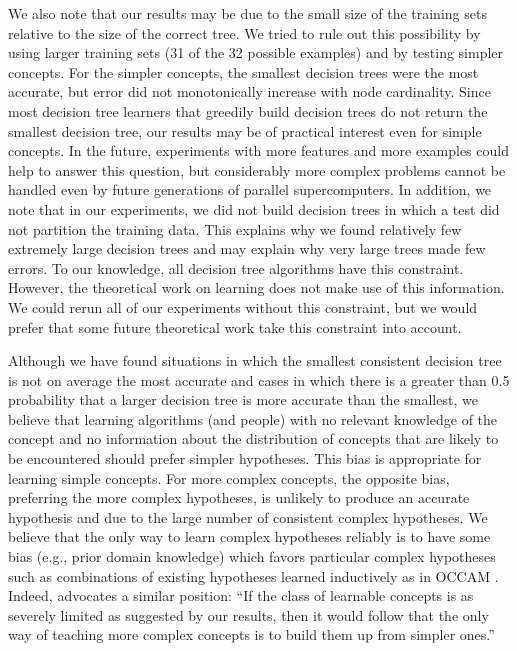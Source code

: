 We also note that our results may be due to the small size of
the training sets relative to the size of the correct tree.  We tried
to rule out this possibility by using larger training sets (31 of the
32 possible examples) and by testing simpler concepts.  For the
simpler concepts, the smallest decision trees were the most accurate,
but error did not monotonically increase with node cardinality.  Since
most decision tree learners that greedily build decision trees do
not return the smallest decision tree, our results may be of practical
interest even for simple concepts.  In the future, experiments with
more features and more examples could help to answer this
question, but considerably more complex problems cannot be handled
even by future generations of parallel supercomputers.  In addition,
we note that in our experiments, we did not build decision
trees in which a test did not partition the training data.  This
explains why we found relatively few extremely large decision trees
and may explain why very large trees made few errors.  To our
knowledge, all decision tree algorithms have this constraint.
However, the theoretical work on learning does not make use of this
information.  We could rerun all of our experiments without this
constraint, but we would prefer that some future theoretical work take
this constraint into account.

Although we have found situations in which the smallest consistent
decision tree is not on average the most accurate and cases in which
there is a greater than 0.5 probability that a larger decision tree is
more accurate than the smallest, we believe that learning algorithms
(and people) with no relevant knowledge of the concept and no
information about the distribution of concepts that are likely to be
encountered should prefer simpler hypotheses.  This bias is
appropriate for learning simple concepts.  For more complex concepts,
the opposite bias, preferring the more complex hypotheses, is unlikely
to produce an accurate hypothesis  and \cite{fayyad90}
due to the large number of consistent complex hypotheses.
We believe that the only way to learn complex hypotheses reliably is
to have some bias (e.g., prior domain knowledge) which favors particular
complex hypotheses such as combinations of existing hypotheses learned
inductively as in OCCAM \cite{pazzani90}.  Indeed, \cite{valiant84}
advocates a similar position: ``If the class of learnable concepts is
as severely limited as suggested by our results, then it would follow
that the only way of teaching more complex concepts is to build them
up from simpler ones.''

